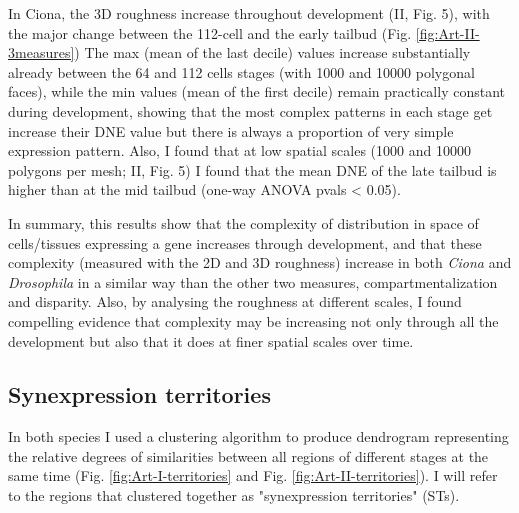 In Ciona, the 3D roughness increase throughout development (II, Fig. 5), with the major change between the 112-cell and the early tailbud (Fig. \ref{fig:Art-II-3measures})  
The max (mean of the last decile) values increase substantially already between the 64 and 112 cells stages (with 1000 and 10000 polygonal faces), while the min values (mean of the first decile) remain practically constant during development, showing that the most complex patterns in each stage get increase their DNE value but there is always a proportion of very simple expression pattern.
Also, I found that at low spatial scales (1000 and 10000 polygons per mesh; II, Fig. 5) I found that the mean DNE of the late tailbud is higher than at the mid tailbud (one-way ANOVA pvals < 0.05).

In summary, this results show that the complexity of distribution in space of cells/tissues expressing a gene increases through development, and that these complexity (measured with the 2D and 3D roughness) increase in both \textit{Ciona} and \textit{Drosophila} in a similar way than the other two measures, compartmentalization and disparity.
Also, by analysing the roughness at different scales, I found compelling evidence that complexity may be increasing not only through all the development but also that it does at finer spatial scales over time.

\subsection{Synexpression territories}
%

In both species I used a clustering algorithm to produce dendrogram representing the relative degrees of similarities between all regions of different stages at the same time (Fig. \ref{fig:Art-I-territories} and Fig. \ref{fig:Art-II-territories}).
I will refer to the regions that clustered together as "synexpression territories" (STs).

